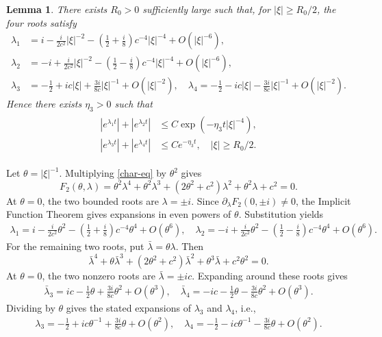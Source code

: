 \documentclass[10pt,reqno]{amsart}
\numberwithin{equation}{section}
\newtheorem{lem}[thm]{Lemma}
\begin{document}
\begin{lem}\label{lem-high}
There exists $R_0>0$ sufficiently large such that, for $|\xi|\ge R_0/2$, the four roots satisfy
\begin{align*}
\lambda_1&=i-\frac{i}{2c^2}|\xi|^{-2}
-\left(\frac12+\frac{i}{8}\right)c^{-4}|\xi|^{-4}+O(|\xi|^{-6}),\\
\lambda_2&=-i+\frac{i}{2c^2}|\xi|^{-2}
-\left(\frac12-\frac{i}{8}\right)c^{-4}|\xi|^{-4}+O(|\xi|^{-6}),\\
\lambda_3&=-\frac12+ic|\xi|+\frac{3i}{8c}|\xi|^{-1}+O(|\xi|^{-2}),\quad \lambda_4 =-\frac12-ic|\xi|-\frac{3i}{8c}|\xi|^{-1}+O(|\xi|^{-2}).
\end{align*}
Hence there exists $\eta_3 >0$ such that
\begin{align}\label{high-eigen-decay}
\begin{aligned}
|e^{\lambda_1t}|+|e^{\lambda_2t}| &\le C\exp\left(-\eta_3  t|\xi|^{-4}\right),\\
|e^{\lambda_3t}|+|e^{\lambda_4t}| &\le Ce^{-\eta_3  t},
\quad |\xi|\ge R_0/2.
\end{aligned}
\end{align}
\end{lem}

\proof
Let $\theta=|\xi|^{-1}$. Multiplying \eqref{char-eq} by $\theta^2$ gives
\[%
F_2(\theta,\lambda) =\theta^2\lambda^4+\theta^2\lambda^3+(2\theta^2+c^2)\lambda^2+\theta^2\lambda+c^2=0.
\]%
At $\theta=0$, the two bounded roots are $\lambda=\pm i$. Since
$\partial_\lambda F_2(0,\pm i)\ne0$, the Implicit Function Theorem gives expansions in even powers of $\theta$. Substitution yields
\begin{align*}
\lambda_1 =i-\frac{i}{2c^2}\theta^2 -\left(\frac12+\frac{i}{8}\right)c^{-4}\theta^4+O(\theta^6),\quad \lambda_2=-i+\frac{i}{2c^2}\theta^2 -\left(\frac12-\frac{i}{8}\right)c^{-4}\theta^4+O(\theta^6).
\end{align*}
For the remaining two roots, put $\bar\lambda=\theta\lambda$. Then
\[
\bar\lambda^4+\theta\bar\lambda^3+(2\theta^2+c^2)\bar\lambda^2
+\theta^3\bar\lambda+c^2\theta^2=0.
\]
At $\theta=0$, the two nonzero roots are $\bar\lambda=\pm ic$. Expanding around these roots gives
\begin{align*}
\bar\lambda_3 =ic-\frac12\theta+\frac{3i}{8c}\theta^2+O(\theta^3),\quad \bar\lambda_4 =-ic-\frac12\theta-\frac{3i}{8c}\theta^2+O(\theta^3).
\end{align*}
Dividing by $\theta$ gives the stated expansions of $\lambda_3$ and $\lambda_4$, i.e.,
\begin{align*}
	\lambda_3 =-\frac12+ic\theta^{-1}+\frac{3i}{8c}\theta+O(\theta^2),\quad \lambda_4 =-\frac12-ic\theta^{-1}-\frac{3i}{8c}\theta+O(\theta^2).
\end{align*}
\end{document}
